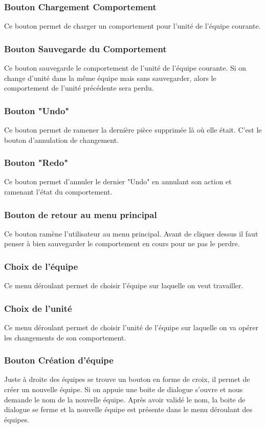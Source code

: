 \documentclass{report}
\begin{document}
\subsubsection{Bouton Chargement Comportement}
Ce bouton permet de charger un comportement pour l'unité de l'équipe courante.
\subsubsection{Bouton Sauvegarde du Comportement}
Ce bouton sauvegarde le comportement de l'unité de l'équipe courante. Si on change d'unité dans la même équipe mais sans sauvegarder, alors le comportement de l'unité précédente sera perdu.
\subsubsection{Bouton "Undo"}
Ce bouton permet de ramener la dernière pièce supprimée là où elle était. C'est le bouton d'annulation de changement.
\subsubsection{Bouton "Redo"}
Ce bouton permet d'annuler le dernier "Undo" en annulant son action et ramenant l'état du comportement.
\subsubsection{Bouton de retour au menu principal}
Ce bouton ramène l'utilisateur au menu principal. Avant de cliquer dessus il faut penser à bien sauvegarder le comportement en cours pour ne pas le perdre.

\subsubsection{Choix de l'équipe}
Ce menu déroulant permet de choisir l'équipe sur laquelle on veut travailler.
\subsubsection{Choix de l'unité}
Ce menu déroulant permet de choisir l'unité de l'équipe sur laquelle on va opérer les changements de son comportement.
\subsubsection{Bouton Création d'équipe}
Juste à droite des équipes se trouve un bouton en forme de croix, il permet de créer un nouvelle équipe. Si on appuie une boite de dialogue s'ouvre et nous demande le nom de la nouvelle équipe. Après avoir validé le nom, la boite de dialogue se ferme et la nouvelle équipe est présente dans le menu déroulant des équipes.
\end{document}
